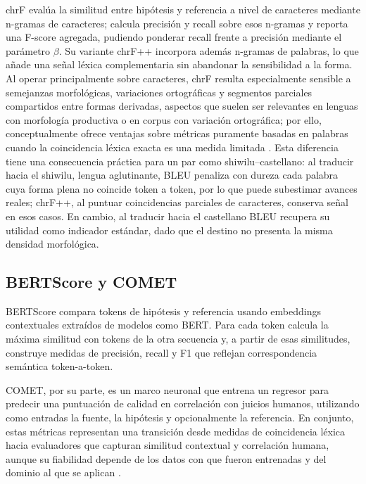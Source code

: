 \documentclass[12pt,a4paper,oneside]{book}
\begin{document}
chrF evalúa la similitud entre hipótesis y referencia a nivel de caracteres mediante n-gramas de caracteres; calcula precisión y recall sobre esos n-gramas y reporta una F-score agregada, pudiendo ponderar recall frente a precisión mediante el parámetro $\beta$. Su variante chrF++ incorpora además n-gramas de palabras, lo que añade una señal léxica complementaria sin abandonar la sensibilidad a la forma. Al operar principalmente sobre caracteres, chrF resulta especialmente sensible a semejanzas morfológicas, variaciones ortográficas y segmentos parciales compartidos entre formas derivadas, aspectos que suelen ser relevantes en lenguas con morfología productiva o en corpus con variación ortográfica; por ello, conceptualmente ofrece ventajas sobre métricas puramente basadas en palabras cuando la coincidencia léxica exacta es una medida limitada \parencite{popovic2015chrf}. Esta diferencia tiene una consecuencia práctica para un par como shiwilu--castellano: al traducir hacia el shiwilu, lengua aglutinante, BLEU penaliza con dureza cada palabra cuya forma plena no coincide token a token, por lo que puede subestimar avances reales; chrF++, al puntuar coincidencias parciales de caracteres, conserva señal en esos casos. En cambio, al traducir hacia el castellano BLEU recupera su utilidad como indicador estándar, dado que el destino no presenta la misma densidad morfológica.

\subsection{BERTScore y COMET}\label{bertscore-y-comet}

BERTScore compara tokens de hipótesis y referencia usando embeddings contextuales extraídos de modelos como BERT. Para cada token calcula la máxima similitud con tokens de la otra secuencia y, a partir de esas similitudes, construye medidas de precisión, recall y F1 que reflejan correspondencia semántica token-a-token.

COMET, por su parte, es un marco neuronal que entrena un regresor para predecir una puntuación de calidad en correlación con juicios humanos, utilizando como entradas la fuente, la hipótesis y opcionalmente la referencia. En conjunto, estas métricas representan una transición desde medidas de coincidencia léxica hacia evaluadores que capturan similitud contextual y correlación humana, aunque su fiabilidad depende de los datos con que fueron entrenadas y del dominio al que se aplican \parencite{zhang2020bertscore,rei2020comet}.
\end{document}

